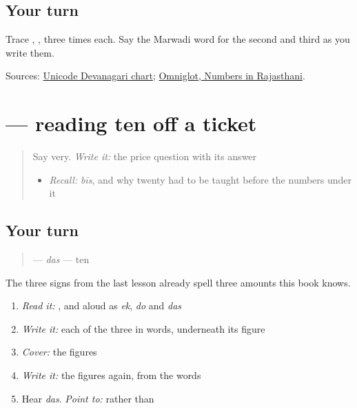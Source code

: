 \subsection*{Your turn}
Trace \textbf{}, \textbf{}, \textbf{} three times each. Say the Marwadi word for the second and third as you write them.

\begin{tcolorbox}[breakable,colback=teal!4,colframe=teal!35!black,title={Before you move on}]
Sources: \href{https://www.unicode.org/charts/PDF/U0900.pdf}{Unicode Devanagari chart}; \href{https://www.omniglot.com/language/numbers/rajasthani.htm}{Omniglot, Numbers in Rajasthani}.
\end{tcolorbox}
\section[Practice]{ — reading ten off a ticket}

\label{lesson:MW-C35-read-ten-ticket}



\begin{quote}
Say very. \emph{Write it:} the price question with its answer

\begin{itemize}
\raggedright
  \item \emph{Recall:} \emph{bīs}, and why twenty had to be taught before the numbers under it
\end{itemize}
\end{quote}

\subsection*{Your turn}
\begin{quote}
\textbf{} — \emph{das} — ten
\end{quote}

The three signs from the last lesson already spell three amounts this book knows.

\begin{enumerate}
\raggedright
  \item \emph{Read it:} \textbf{}, \textbf{} and \textbf{} aloud as \emph{ek}, \emph{do} and \emph{das}
  \item \emph{Write it:} each of the three in words, underneath its figure
  \item \emph{Cover:} the figures
  \item \emph{Write it:} the figures again, from the words
  \item Hear \emph{das}. \emph{Point to:} \textbf{} rather than \textbf{}
\end{enumerate}

